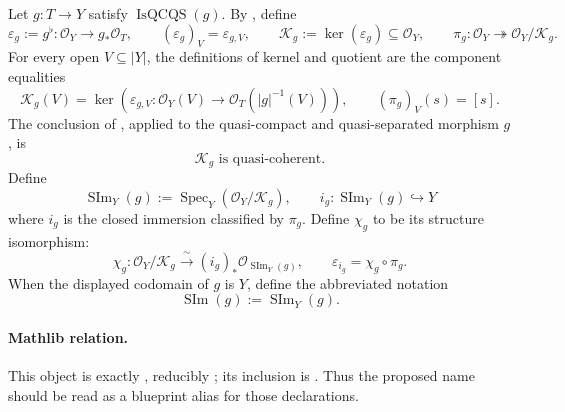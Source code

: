\begin{definition}
  \label{def:nagata-scheme-theoretic-image}

  Let \(g\colon T\to Y\) satisfy
  \(\operatorname{IsQCQS}(g)\).  By
  , define
  \[
    \varepsilon_g:=g^\flat\colon\mathcal O_Y\longrightarrow g_*\mathcal O_T,
    \qquad
    (\varepsilon_g)_V=\varepsilon_{g,V},
    \qquad
    \mathcal K_g:=\ker(\varepsilon_g)\subseteq\mathcal O_Y,
    \qquad
    \pi_g\colon\mathcal O_Y\twoheadrightarrow
      \mathcal O_Y/\mathcal K_g.
  \]
  For every open $V\subseteq|Y|$, the definitions of kernel and quotient are
  the component equalities
  \[
    \mathcal K_g(V)
      =\ker\!\left(
        \varepsilon_{g,V}\colon\mathcal O_Y(V)\to
        \mathcal O_T(|g|^{-1}(V))
      \right),
    \qquad
    (\pi_g)_V(s)=[s].
  \]
  The conclusion of
  \cite[\href{https://stacks.math.columbia.edu/tag/01R5}{Tag 01R5}]
  {stacks-project}, applied to the quasi-compact and quasi-separated morphism
  $g$, is
  \[
    \mathcal K_g\text{ is quasi-coherent}.
  \]
  Define
  \[
    \operatorname{SIm}_Y(g):=
      \operatorname{Spec}_Y(\mathcal O_Y/\mathcal K_g),
    \qquad
    i_g\colon\operatorname{SIm}_Y(g)\hookrightarrow Y
  \]
  where $i_g$ is the closed immersion classified by $\pi_g$.  Define
  $\chi_g$ to be its structure isomorphism:
  \[
    \chi_g\colon\mathcal O_Y/\mathcal K_g
      \xrightarrow{\ \sim\ }(i_g)_*
      \mathcal O_{\operatorname{SIm}_Y(g)},
    \qquad
    \varepsilon_{i_g}=\chi_g\circ\pi_g.
  \]
  When the displayed codomain of $g$ is $Y$, define the abbreviated notation
  \[
    \operatorname{SIm}(g):=\operatorname{SIm}_Y(g).
  \]

  \paragraph{Mathlib relation.}
  This object is exactly
  \texttt{}, reducibly
  \texttt{}; its inclusion is
  \texttt{}.  Thus the proposed name
  \texttt{} should be read as a
  blueprint alias for those declarations.
\end{definition}

